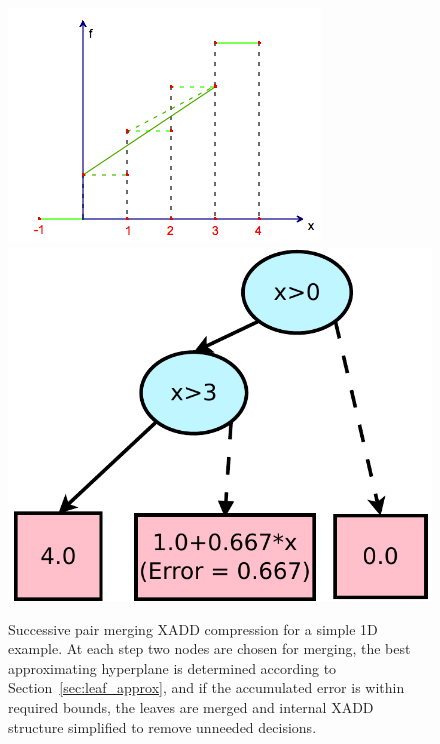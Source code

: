\begin{figure}[t!]
{\begin{minipage}{.25\textwidth}
	\includegraphics[width=\textwidth]{Figures/stepfun/succ3.png}
	\end{minipage}
	\begin{minipage}{.2\textwidth}
	\includegraphics[width=\textwidth]{Figures/xadds/succ3.pdf}
	\end{minipage}
	 \label{step2}
}
\caption{ \footnotesize Successive pair merging XADD compression for a simple 1D example.
At each step two nodes are chosen for merging, the best approximating
hyperplane is determined according to Section~\ref{sec:leaf_approx},
and if the accumulated error is within required bounds, the leaves are
merged and internal XADD structure simplified to remove unneeded
decisions.}  \label{fig:steplining}
\end{figure}

